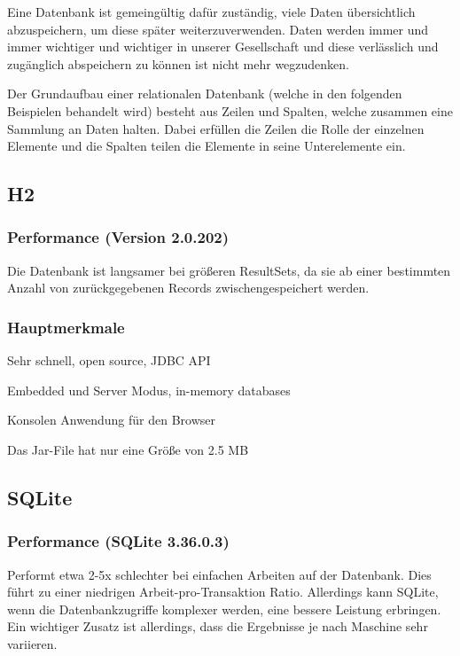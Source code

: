 
Eine Datenbank ist gemeingültig dafür zuständig, viele Daten übersichtlich abzuspeichern, um diese später weiterzuverwenden. Daten werden immer und immer wichtiger und wichtiger in unserer Gesellschaft und diese verlässlich und zugänglich abspeichern zu können ist nicht mehr wegzudenken.
 
Der Grundaufbau einer relationalen Datenbank (welche in den folgenden Beispielen behandelt wird) besteht aus Zeilen und Spalten, welche zusammen eine Sammlung an Daten halten. Dabei erfüllen die Zeilen die Rolle der einzelnen Elemente und die Spalten teilen die Elemente in seine Unterelemente ein. \cite{javaInselBuch}
 
 
\subsection{H2}
 
\subsubsection{Performance (Version 2.0.202)}
Die Datenbank ist langsamer bei größeren ResultSets, da sie ab einer bestimmten Anzahl von zurückgegebenen Records zwischengespeichert werden. \cite{databaseComparison}
 
\subsubsection{Hauptmerkmale}
\begin{compactitem}
    \item Sehr schnell, open source, JDBC API
    \item Embedded und Server Modus, in-memory databases        
    \item Konsolen Anwendung für den Browser
    \item Das Jar-File hat nur eine Größe von 2.5 MB
\end{compactitem} 
\cite{databaseComparison}

 
\subsection{SQLite}
 
\subsubsection{Performance (SQLite 3.36.0.3)}
Performt etwa 2-5x schlechter bei einfachen Arbeiten auf der Datenbank. Dies führt zu einer niedrigen Arbeit-pro-Transaktion Ratio. Allerdings kann SQLite, wenn die Datenbankzugriffe komplexer werden, eine bessere Leistung erbringen. Ein wichtiger Zusatz ist allerdings, dass die Ergebnisse je nach Maschine sehr variieren. \cite{databaseComparison}

